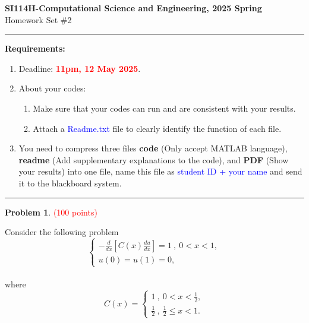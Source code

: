 \documentclass[english,onecolumn]{IEEEtran}
\begin{document}
\begin{center}
	\textbf{\LARGE{SI114H-Computational Science and Engineering, 2025 Spring}}\\
	{\Large Homework Set \#2}\\
\par\end{center}

\noindent
\rule{\linewidth}{0.4pt}
{\bf Requirements:}
\begin{enumerate}
	\item Deadline: {\bf \textcolor{red}{11pm, 12 May 2025}}. %

	\item About your codes:
	\begin{enumerate}
	    \item Make sure that your codes can run and are consistent with your results.
	    \item Attach a {\textcolor{blue}{Readme.txt}} file to clearly identify the function of each file.
	\end{enumerate}

 \item You need to compress three files \textbf{code} (Only accept MATLAB language), \textbf{readme} (Add supplementary explanations to the code), and \textbf{PDF} (Show your results) into one file, name this file as \textcolor{blue}{student ID + your name} and send it to the blackboard system.

\end{enumerate}
\rule{\linewidth}{0.4pt}



\noindent\textbf{Problem 1}. \textcolor{red}{(100 points)} \par
Consider the following problem
\begin{equation}
    \begin{cases}
    -\frac{d}{dx}[C(x)\frac{du}{dx}] = 1 \ , \ 0<x<1,\\
    u(0)=u(1)=0,
    \end{cases}
    \label{problem}
\end{equation}\\
where \begin{equation}
    C(x)=\begin{cases}
        1  \ ,\  0<x<\frac{1}{2},\\
        \frac{1}{2} \ , \  \frac{1}{2}\leq x<1.
    \end{cases}
\end{equation}
\end{document}

